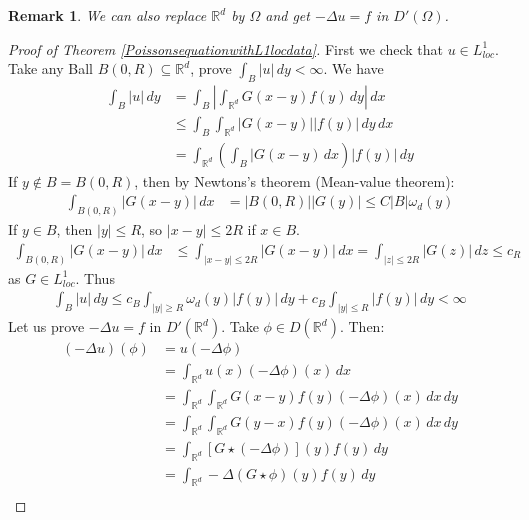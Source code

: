 \documentclass{report}
\theoremstyle{tommy}
\newtheorem{rem}[defn]{Remark}
\begin{document}
  \begin{rem}
    We can also replace \(\mathbb{R}^d\) by \(\Omega\) and get \(- \Delta u = f\) in \(D'(\Omega)\). 
  \end{rem}

  \begin{proof}[Proof of Theorem \ref{PoissonsequationwithL1locdata}]
    First we check that \(u \in L_{loc}^1\). Take any Ball \(B(0, R) \subseteq \mathbb{R}^d\), prove \(\int_B |u| \, dy < \infty\). We have 
    \begin{align*}
      \int_B |u| \, dy 
      &= \int_B \left| \int_{\mathbb{R}^d} G(x-y) f(y) \, dy \right| \, dx \\
      &\le \int_B \int_{\mathbb{R}^d} |G(x-y)||f(y)| \, dy \, dx \\
      &= \int_{\mathbb{R}^d} \left(\int_B |G(x-y) \, dx\right)|f(y)| \, dy
    \end{align*}
    If \(y \notin B = B(0,R)\), then by Newtons's theorem (Mean-value theorem):
    \begin{align*}
      \int_{B(0, R)} |G(x-y)| \, dx
      &= |B(0, R)| |G(y)|
      \le C|B| \omega_d(y)
    \end{align*}
    If \(y \in B\), then \(|y| \le R\), so \(|x-y| \le 2 R\) if \(x \in B\).
    \begin{align*}
      \int_{B(0,R)}|G(x-y)| \, dx
      &\le \int_{|x-y|\le 2 R} |G(x-y)| \, dx
      = \int_{|z| \le 2 R} |G(z)| \, dz 
      \le c_R
    \end{align*}
    as \(G \in L_{loc}^1\). Thus
    \begin{align*}
      \int_B |u| \, dy 
      \le c_B \int_{|y|\ge R} \omega_d (y) |f(y)|\, dy + c_B \int_{|y|\le R} |f(y)| \, dy < \infty
    \end{align*}
    Let us prove \(- \Delta u = f\) in \(D'(\mathbb{R}^d)\). Take \(\phi \in D(\mathbb{R}^d)\). Then:
    \begin{align*}
      (-\Delta u)(\phi)
      &= u(-\Delta \phi)\\
      &= \int_{\mathbb{R}^d} u(x) (-\Delta \phi)(x) \, dx \\
      &= \int_{\mathbb{R}^d}\int_{\mathbb{R}^d} G(x-y) f(y) (-\Delta \phi)(x) \, dx \, dy\\
      &= \int_{\mathbb{R}^d}\int_{\mathbb{R}^d} G(y-x) f(y) (-\Delta \phi)(x) \, dx \, dy \\
      &= \int_{\mathbb{R}^d} [G \star (-\Delta \phi)](y) f(y) \, dy \\
      &= \int_{\mathbb{R}^d} -\Delta(G\star \phi)(y) f(y) \, dy \\

\end{align*}
\end{proof}
\end{document}
